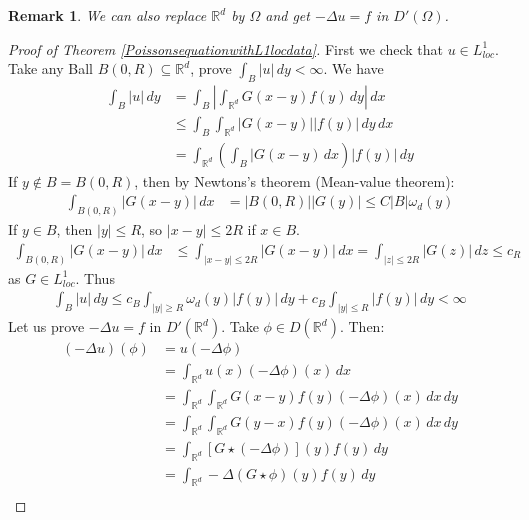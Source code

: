 \documentclass{report}
\theoremstyle{tommy}
\newtheorem{rem}[defn]{Remark}
\begin{document}
  \begin{rem}
    We can also replace \(\mathbb{R}^d\) by \(\Omega\) and get \(- \Delta u = f\) in \(D'(\Omega)\). 
  \end{rem}

  \begin{proof}[Proof of Theorem \ref{PoissonsequationwithL1locdata}]
    First we check that \(u \in L_{loc}^1\). Take any Ball \(B(0, R) \subseteq \mathbb{R}^d\), prove \(\int_B |u| \, dy < \infty\). We have 
    \begin{align*}
      \int_B |u| \, dy 
      &= \int_B \left| \int_{\mathbb{R}^d} G(x-y) f(y) \, dy \right| \, dx \\
      &\le \int_B \int_{\mathbb{R}^d} |G(x-y)||f(y)| \, dy \, dx \\
      &= \int_{\mathbb{R}^d} \left(\int_B |G(x-y) \, dx\right)|f(y)| \, dy
    \end{align*}
    If \(y \notin B = B(0,R)\), then by Newtons's theorem (Mean-value theorem):
    \begin{align*}
      \int_{B(0, R)} |G(x-y)| \, dx
      &= |B(0, R)| |G(y)|
      \le C|B| \omega_d(y)
    \end{align*}
    If \(y \in B\), then \(|y| \le R\), so \(|x-y| \le 2 R\) if \(x \in B\).
    \begin{align*}
      \int_{B(0,R)}|G(x-y)| \, dx
      &\le \int_{|x-y|\le 2 R} |G(x-y)| \, dx
      = \int_{|z| \le 2 R} |G(z)| \, dz 
      \le c_R
    \end{align*}
    as \(G \in L_{loc}^1\). Thus
    \begin{align*}
      \int_B |u| \, dy 
      \le c_B \int_{|y|\ge R} \omega_d (y) |f(y)|\, dy + c_B \int_{|y|\le R} |f(y)| \, dy < \infty
    \end{align*}
    Let us prove \(- \Delta u = f\) in \(D'(\mathbb{R}^d)\). Take \(\phi \in D(\mathbb{R}^d)\). Then:
    \begin{align*}
      (-\Delta u)(\phi)
      &= u(-\Delta \phi)\\
      &= \int_{\mathbb{R}^d} u(x) (-\Delta \phi)(x) \, dx \\
      &= \int_{\mathbb{R}^d}\int_{\mathbb{R}^d} G(x-y) f(y) (-\Delta \phi)(x) \, dx \, dy\\
      &= \int_{\mathbb{R}^d}\int_{\mathbb{R}^d} G(y-x) f(y) (-\Delta \phi)(x) \, dx \, dy \\
      &= \int_{\mathbb{R}^d} [G \star (-\Delta \phi)](y) f(y) \, dy \\
      &= \int_{\mathbb{R}^d} -\Delta(G\star \phi)(y) f(y) \, dy \\

\end{align*}
\end{proof}
\end{document}
